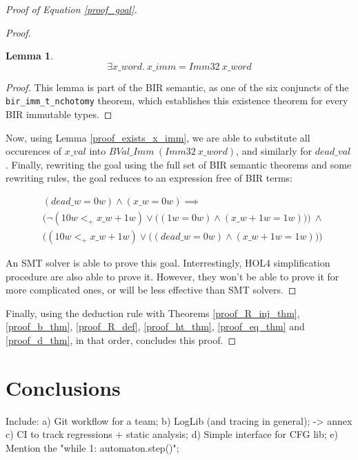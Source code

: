 \documentclass{kththesis}
\newtheorem{lemma}[theorem]{Lemma}
\begin{document}
\begin{proof}[Proof of Equation \ref{proof_goal}]
\begin{proof}
\begin{lemma}
	\begin{equation*}
		\exists x\_word.~x\_imm = Imm32~x\_word
	\end{equation*}
	\label{proof_exists_x_word}
\end{lemma}
\begin{proof}
This lemma is part of the BIR semantic, as one of the six conjuncts of the \texttt{bir\_imm\_t\_nchotomy} theorem, which establishes this existence theorem for every BIR immutable types.
\end{proof}

Now, using Lemma \ref{proof_exists_x_imm}, we are able to substitute all occurences of $x\_val$ into $BVal\_Imm~(Imm32~x\_word)$, and similarly for $dead\_val$. Finally, rewriting the goal using the full set of BIR semantic theorems and some rewriting rules, the goal reduces to an expression free of BIR terms:

\begin{equation} \label{proof_wp_word_goal}
\begin{split}
&(dead\_w = 0w) \land (x\_w = 0w) \implies\\
&\Big(\neg(10w <_{+} x\_w + 1w) \lor \big((1w = 0w) \land (x\_w + 1w = 1w)\big)\Big)~\land\\
&\Big((10w <_{+} x\_w + 1w) \lor \big((dead\_w = 0w) \land (x\_w + 1w = 1w)\big)\Big)
\end{split}
\end{equation}

An \gls{SMT} solver is able to prove this goal. Interrestingly, HOL4 simplification procedure are also able to prove it. However, they won't be able to prove it for more complicated ones, or will be less effective than SMT solvers.
\end{proof} %

Finally, using the deduction rule with Theorems \ref{proof_R_inj_thm}, \ref{proof_b_thm}, \ref{proof_R_def}, \ref{proof_ht_thm}, \ref{proof_eq_thm} and \ref{proof_d_thm}, in that order, concludes this proof.
\renewcommand\qedsymbol{$\blacksquare$}
\end{proof}

\chapter{Conclusions}

Include:%
a) Git workflow for a team;%
b) LogLib (and tracing in general); -> annex%
c) CI to track regressions + static analysis;%
d) Simple interface for CFG lib;%
e) Mention the "while 1: automaton.step()";%
\end{document}
